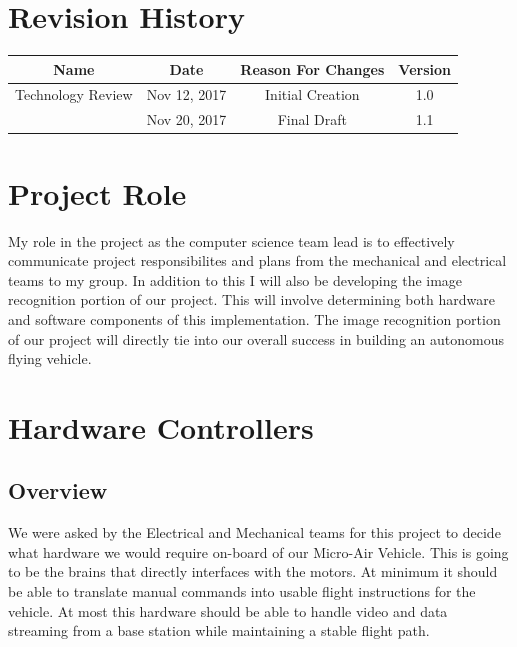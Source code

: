 \documentclass[onecolumn, draftclsnofoot,10pt, compsoc]{IEEEtran}
\begin{document}
\section*{Revision History}

\begin{center}
    \begin{tabular}{|c|c|c|c|}
        \hline
		Name & Date & Reason For Changes & Version\\
        \hline
		Technology Review & Nov 12, 2017 & Initial Creation & 1.0\\
        \hline
		& Nov 20, 2017 & Final Draft & 1.1\\
	\hline 
    \end{tabular}
\end{center}

\section{Project Role}

My role in the project as the computer science team lead is to effectively 
communicate project responsibilites and plans from the mechanical and electrical 
teams to my group. In addition to this I will also be developing the image 
recognition portion of our project. This will involve determining both hardware 
and software components of this implementation. The image recognition portion of 
our project will directly tie into our overall success in building an autonomous 
flying vehicle.  

\section{Hardware Controllers}

\subsection{Overview}

We were asked by the Electrical and Mechanical teams for this 
project to decide what hardware we would require on-board of our 
Micro-Air Vehicle. This is going to be the brains that directly 
interfaces with the motors. At minimum it should be able to 
translate manual commands into usable flight instructions for the 
vehicle. At most this hardware should be able to handle video and 
data streaming from a base station while maintaining a stable 
flight path. 
\end{document}

